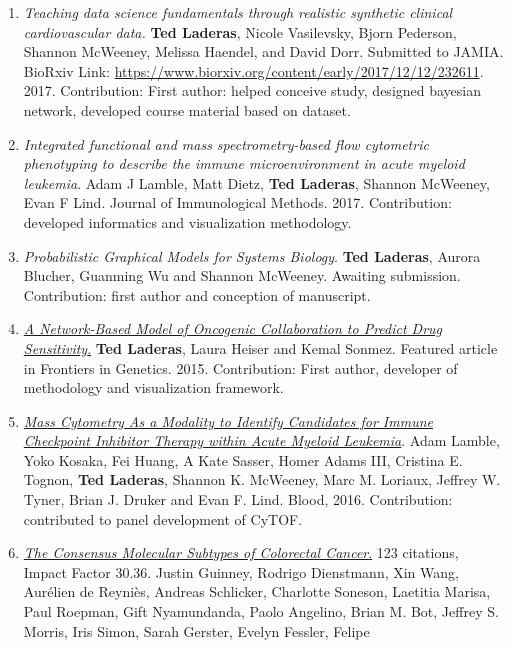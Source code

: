 \documentclass[11pt,]{article}
\begin{document}
\begin{enumerate}
\def\labelenumi{\arabic{enumi}.}
\item
  \emph{Teaching data science fundamentals through realistic synthetic
  clinical cardiovascular data.} \textbf{Ted Laderas}, Nicole
  Vasilevsky, Bjorn Pederson, Shannon McWeeney, Melissa Haendel, and
  David Dorr. Submitted to JAMIA. BioRxiv Link:
  \url{https://www.biorxiv.org/content/early/2017/12/12/232611}. 2017.
  Contribution: First author: helped conceive study, designed bayesian
  network, developed course material based on dataset.
\item
  \emph{Integrated functional and mass spectrometry-based flow
  cytometric phenotyping to describe the immune microenvironment in
  acute myeloid leukemia}. Adam J Lamble, Matt Dietz, \textbf{Ted
  Laderas}, Shannon McWeeney, Evan F Lind. Journal of Immunological
  Methods. 2017. Contribution: developed informatics and visualization
  methodology.
\item
  \emph{Probabilistic Graphical Models for Systems Biology}. \textbf{Ted
  Laderas}, Aurora Blucher, Guanming Wu and Shannon McWeeney. Awaiting
  submission. Contribution: first author and conception of manuscript.
\item
  \href{http://journal.frontiersin.org/article/10.3389/fgene.2015.00341/abstract}{\emph{A
  Network-Based Model of Oncogenic Collaboration to Predict Drug
  Sensitivity}.} \textbf{Ted Laderas}, Laura Heiser and Kemal Sonmez.
  Featured article in Frontiers in Genetics. 2015. Contribution: First
  author, developer of methodology and visualization framework.
\item
  \href{http://www.bloodjournal.org/content/128/22/2829?sso-checked=true}{\emph{Mass
  Cytometry As a Modality to Identify Candidates for Immune Checkpoint
  Inhibitor Therapy within Acute Myeloid Leukemia}}. Adam Lamble, Yoko
  Kosaka, Fei Huang, A Kate Sasser, Homer Adams III, Cristina E. Tognon,
  \textbf{Ted Laderas}, Shannon K. McWeeney, Marc M. Loriaux, Jeffrey W.
  Tyner, Brian J. Druker and Evan F. Lind. Blood, 2016. Contribution:
  contributed to panel development of CyTOF.
\item
  \href{https://www.dropbox.com/s/p92dn5buctlyqpc/nm.3967.pdf?dl=0}{\emph{The
  Consensus Molecular Subtypes of Colorectal Cancer}.} 123 citations,
  Impact Factor 30.36. Justin Guinney, Rodrigo Dienstmann, Xin Wang,
  Aurélien de Reyniès, Andreas Schlicker, Charlotte Soneson, Laetitia
  Marisa, Paul Roepman, Gift Nyamundanda, Paolo Angelino, Brian M. Bot,
  Jeffrey S. Morris, Iris Simon, Sarah Gerster, Evelyn Fessler, Felipe

\end{enumerate}
\end{document}
